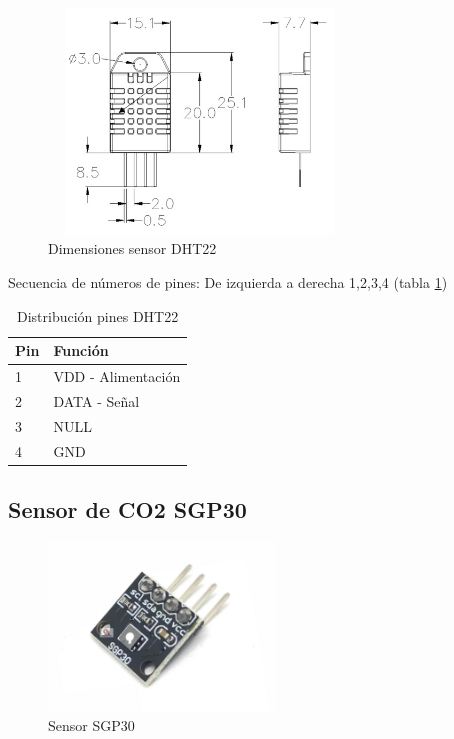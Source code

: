 \begin{figure}[H]
    \centering
    \includegraphics[width=8cm, height=6cm]{imagenes/dht22 dimensiones.jpg}
    \caption{Dimensiones sensor DHT22}
    \label{imag:dimensiones_dht22}
\end{figure}

Secuencia de números de pines: De izquierda a derecha 1,2,3,4 (tabla \ref{tab:pines_DHT})

\begin{table}[H]
    \centering
    \caption{Distribución pines DHT22}
    \label{tab:pines_DHT}
    \begin{tabular}{|l|l|}
    \hline
    Pin & Función            \\ \hline
    1   & VDD - Alimentación \\ \hline
    2   & DATA - Señal       \\ \hline
    3   & NULL               \\ \hline
    4   & GND                \\ \hline
    \end{tabular}
\end{table}

\subsection{Sensor de CO2 SGP30}

\begin{figure}[H]
      \centering
      \includegraphics[width=6cm, height=4.5cm]{imagenes/sgp30.jpg}
      \caption{Sensor SGP30}
      \label{imag:sgp30}
\end{figure}

